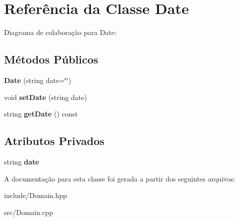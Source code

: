 \hypertarget{classDate}{}\section{Referência da Classe Date}
\label{classDate}


Diagrama de colaboração para Date\+:
\subsection*{Métodos Públicos}
\begin{DoxyCompactItemize}
\item 
{\bfseries Date} (string date=\char`\"{}\char`\"{})\hypertarget{classDate_ae1cc6ea206e77eb384dd940b4f4bafb1}{}\label{classDate_ae1cc6ea206e77eb384dd940b4f4bafb1}

\item 
void {\bfseries set\+Date} (string date)\hypertarget{classDate_abbd3c22e63d9fb3fbb1a34e5614aab22}{}\label{classDate_abbd3c22e63d9fb3fbb1a34e5614aab22}

\item 
string {\bfseries get\+Date} () const \hypertarget{classDate_a5d6497b6ae42071efff693e6ff3881a1}{}\label{classDate_a5d6497b6ae42071efff693e6ff3881a1}

\end{DoxyCompactItemize}
\subsection*{Atributos Privados}
\begin{DoxyCompactItemize}
\item 
string {\bfseries date}\hypertarget{classDate_a8ffcd034623f1a4eac1b86aadfa3133d}{}\label{classDate_a8ffcd034623f1a4eac1b86aadfa3133d}

\end{DoxyCompactItemize}


A documentação para esta classe foi gerada a partir dos seguintes arquivos\+:\begin{DoxyCompactItemize}
\item 
include/Domain.\+hpp\item 
src/Domain.\+cpp\end{DoxyCompactItemize}
